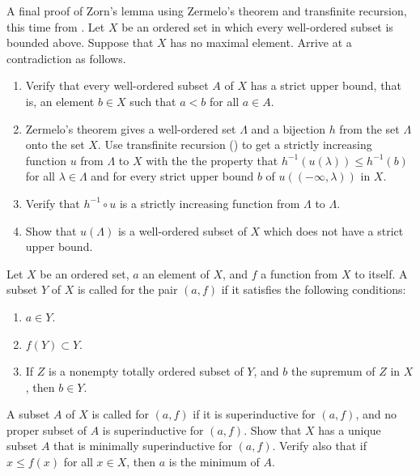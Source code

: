 \documentclass{article}
\begin{document}
\begin{exercise}
  \label{exe:k8tmok20}
  A final proof of Zorn's lemma using Zermelo's theorem and
  transfinite recursion, this time from \textcite[Chapter~XVI, \S4,
  Theorem~1]{bib:embpmrus}.  Let \(X\) be an ordered set in which
  every well-ordered subset is bounded above.  Suppose that \(X\) has
  no maximal element.  Arrive at a contradiction as follows.
  \begin{enumerate}
  \item Verify that every well-ordered subset \(A\) of \(X\) has a
    strict upper bound, that is, an element \(b \in X\) such that
    \(a < b\) for all \(a \in A\).
  \item Zermelo's theorem gives a well-ordered set \(\Lambda\) and a
    bijection \(h\) from the set \(\Lambda\) onto the set \(X\).  Use
    transfinite recursion () to get a strictly
    increasing function \(u\) from \(\Lambda\) to \(X\) with the the
    property that \(h^{-1}(u(\lambda)) \leq h^{-1}(b)\) for all
    \(\lambda \in \Lambda\) and for every strict upper bound \(b\) of
    \(u((-\infty, \lambda))\) in \(X\).
  \item Verify that \(h^{-1} \circ u\) is a strictly increasing
    function from \(\Lambda\) to \(\Lambda\).
  \item Show that \(u(\Lambda)\) is a well-ordered subset of \(X\)
    which does not have a strict upper bound.
  \end{enumerate}
\end{exercise}

\begin{exercise}
  \label{exe:8yw1mw3a}
  Let \(X\) be an ordered set, \(a\) an element of \(X\), and \(f\) a
  function from \(X\) to itself.  A subset \(Y\) of \(X\) is called
   for the pair \((a, f)\) if it satisfies
  the following conditions:
  \begin{enumerate}
  \item \(a \in Y\).
  \item \(f(Y) \subset Y\).
  \item If \(Z\) is a nonempty totally ordered subset of \(Y\), and
    \(b\) the supremum of \(Z\) in \(X\), then \(b \in Y\).
  \end{enumerate}
  A subset \(A\) of \(X\) is called  for \((a, f)\) if it is superinductive for
  \((a, f)\), and no proper subset of \(A\) is superinductive for
  \((a, f)\).  Show that \(X\) has a unique subset \(A\) that is
  minimally superinductive for \((a, f)\).  Verify also that if
  \(x \leq f(x)\) for all \(x \in X\), then \(a\) is the minimum of
  \(A\).
\end{exercise}
\end{document}
